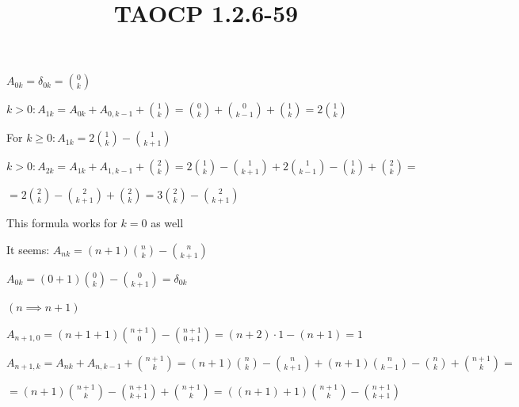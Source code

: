 \documentclass{article}
\title{TAOCP 1.2.6\mbox{-}59}
\begin{document}
\maketitle

\( A_{0k} = \delta_{0k} = \binom{0}{k} \)

\( k > 0: A_{1k} = A_{0k} + A_{0,k-1} + \binom{1}{k} = \binom{0}{k} + \binom{0}{k - 1} + \binom{1}{k} = 2 \binom{1}{k} \)

For \( k \geq 0: A_{1k} = 2\binom{1}{k} - \binom{1}{k + 1} \)

\( k > 0: A_{2k} = A_{1k} + A_{1,k-1} + \binom{2}{k} = 2\binom{1}{k} - \binom{1}{k+1} + 2\binom{1}{k-1} - \binom{1}{k} + \binom{2}{k} = \)

\( = 2\binom{2}{k} - \binom{2}{k+1} + \binom{2}{k} = 3 \binom{2}{k} - \binom{2}{k+1} \)

This formula works for \( k = 0 \) as well

It seems: \( A_{nk} = (n+1) \binom{n}{k} - \binom{n}{k+1} \)

\( A_{0k} = (0+1)\binom{0}{k} - \binom{0}{k+1} = \delta_{0k} \)

\( (n \implies n + 1) \)

\( A_{n+1,0} = (n+1+1)\binom{n+1}{0} - \binom{n+1}{0+1} = (n+2)\cdot 1 - (n + 1) = 1 \)

\( A_{n+1,k} = A_{nk} + A_{n,k-1} + \binom{n+1}{k} = (n+1) \binom{n}{k} - \binom{n}{k+1} + (n+1) \binom{n}{k - 1} - \binom{n}{k} + \binom{n+1}{k} = \)

\( = (n+1)\binom{n+1}{k} - \binom{n+1}{k+1} + \binom{n+1}{k} = ((n+1)+1)\binom{n+1}{k} - \binom{n+1}{k+1} \)
\end{document}
